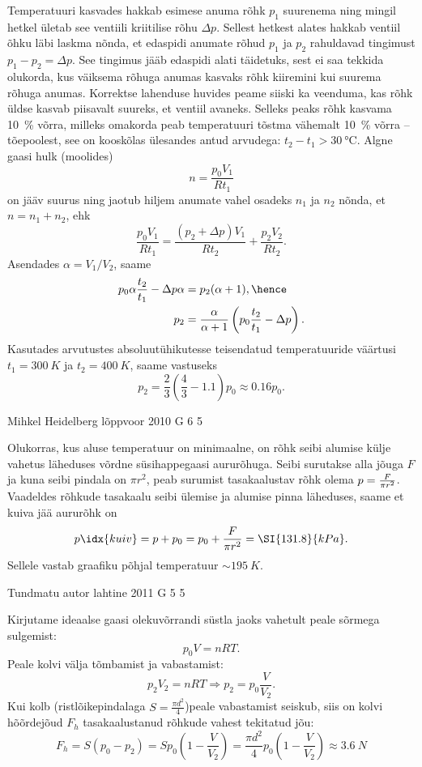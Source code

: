 \documentclass[11pt]{article}
\begin{document}
{{\ifSolution
Temperatuuri kasvades hakkab esimese anuma rõhk $p_1$ suurenema ning mingil hetkel ületab see ventiili kriitilise rõhu $\Delta p$. Sellest hetkest alates hakkab ventiil õhku läbi laskma nõnda, et edaspidi anumate rõhud $p_1$ ja $p_2$ rahuldavad tingimust $p_1 - p_2 = \Delta p$. See tingimus jääb edaspidi alati täidetuks, sest ei saa tekkida olukorda, kus väiksema rõhuga anumas kasvaks rõhk kiiremini kui suurema rõhuga anumas. Korrektse lahenduse huvides peame siiski ka veenduma, kas rõhk üldse kasvab piisavalt suureks, et ventiil avaneks. Selleks peaks rõhk kasvama \SI{10}{\%} võrra, milleks omakorda peab temperatuuri tõstma vähemalt \SI{10}{\%} võrra – tõepoolest, see on kooskõlas ülesandes antud arvudega: $t_2 - t_1 > \SI{30}{\celsius}$. Algne gaasi hulk (moolides)
\[
n=\frac{p_{0} V_{1}}{R t_{1}}
\]
on jääv suurus ning jaotub hiljem anumate vahel osadeks $n_1$ ja $n_2$ nõnda, et $n = n_1+ n_2$, ehk
\[
\frac{p_{0} V_{1}}{R t_{1}}=\frac{\left(p_{2}+\Delta p\right) V_{1}}{R t_{2}}+\frac{p_{2} V_{2}}{R t_{2}}.
\]
Asendades $\alpha = V_1/V_2$, saame
\begin{align*}
p_{0} \alpha \frac{t_{2}}{t_{1}}-\Delta p \alpha&=p_{2}(\alpha+1),\hence
\\
p_{2}&=\frac{\alpha}{\alpha+1}\left(p_{0} \frac{t_{2}}{t_{1}}-\Delta p\right).
\end{align*}
Kasutades arvutustes absoluutühikutesse teisendatud temperatuuride väärtusi $t_1= \SI{300}{K}$ ja $t_2= \SI{400}{K}$, saame vastuseks
\[
p_2=\frac 23 \left(\frac 43- \num{1,1}\right) p_0 \approx \num{0,16}p_0.
\]
\fi
}

{Mihkel Heidelberg} %
{lõppvoor} %
{2010} %
{G 6} %
{5} %
{

\ifSolution
Olukorras, kus aluse temperatuur on minimaalne, on rõhk seibi alumise külje vahetus läheduses võrdne
süsihappegaasi aururõhuga. Seibi surutakse alla jõuga $F$ ja kuna seibi
pindala on $\pi r^2$, peab surumist tasakaalustav rõhk olema $p={F\over \pi r^2}$.
Vaadeldes rõhkude tasakaalu seibi ülemise ja alumise pinna läheduses, saame et kuiva jää aururõhk on
\[
p\idx{kuiv} = p + p_0= p_0+{F\over \pi r^2} = \SI{131.8}{kPa}.
\]
Sellele vastab graafiku põhjal temperatuur $\sim \SI{195}{K}$.
\fi
}

{Tundmatu autor} %
{lahtine} %
{2011} %
{G 5} %
{5} %
{

\ifSolution
Kirjutame ideaalse gaasi olekuvõrrandi süstla jaoks vahetult peale sõrmega sulgemist:
\[p_{0}V=nRT.\]
Peale kolvi välja tõmbamist ja vabastamist:
\[p_{2}V_{2}=nRT \Rightarrow p_{2}=p_{0}\frac{V}{V_{2}}. \]
Kui kolb (ristlõikepindalaga $S=\frac{\pi d^{2}}{4}$)peale vabastamist seiskub, siis on kolvi hõõrdejõud $F_{h}$ tasakaalustanud rõhkude vahest tekitatud jõu:
\[F_{h}=S(p_{0}-p_{2})=Sp_{0} \left(1-\frac{V}{V_{2}}\right)=\frac{\pi
	d^{2}}{4}p_{0} \left(1-\frac{V}{V_{2}}\right) \approx \SI{3,6}{N} \]
\fi
}

}
\end{document}
